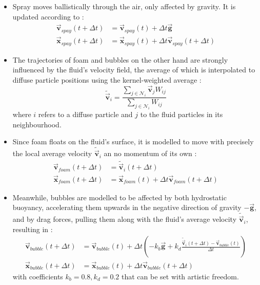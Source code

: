 \documentclass[oneside, a4paper]{book}
\newcommand\vek[1]{\vec{\bm{#1}}}
\newcommand\br[1]{\left(#1\right)}
\begin{document}
  \begin{itemize}
    \item Spray moves ballistically through the air, only affected by gravity. It is updated according to \autocite{spray-foam-bubbles}:
    \begin{align}
      \vek{v}_{spay}\br{t+\Delta t} &= \vek{v}_{spay}\br{t} + \Delta t \vek{g}\\
      \vek{x}_{spay}\br{t+\Delta t} &= \vek{x}_{spay}\br{t} + \Delta t \vek{v}_{spay}\br{t+\Delta t}
    \end{align}
    \item The trajectories of foam and bubbles on the other hand are strongly influenced by the fluid's velocity field, the average of which is interpolated to diffuse particle positions using the kernel-weighted average \autocite{spray-foam-bubbles}:
    \begin{equation}
      \widetilde{\vek{v}}_i = \frac{\sum_{j\in\mathcal{N}_{i}} \vek{v}_{j} W_{ij} }{\sum_{j\in\mathcal{N}_{i}} W_{ij}}
    \end{equation}
    where $i$ refers to a diffuse particle and $j$ to the fluid particles in its neighbourhood.
    \item Since foam floats on the fluid's surface, it is modelled to move with precisely the local average velocity $\widetilde{\vek{v}}_i$ an no momentum of its own \autocite{spray-foam-bubbles}:
    \begin{align}
      \vek{v}_{foam}\br{t+\Delta t} &= \widetilde{\vek{v}}_i\br{t+\Delta t}\\
      \vek{x}_{foam}\br{t+\Delta t} &= \vek{x}_{foam}\br{t} + \Delta t \vek{v}_{foam}\br{t+\Delta t}
    \end{align}
    \item Meanwhile, bubbles are modelled to be affected by both hydrostatic buoyancy, accelerating them upwards in the negative direction of gravity $-\vek{g}$, and by drag forces, pulling them along with the fluid's average velocity $\widetilde{\vek{v}}_i$, resulting in \autocite{spray-foam-bubbles}:
    \begin{align}
      \vek{v}_{bubble}\br{t+\Delta t} &=\vek{v}_{bubble}\br{t} + \Delta t \br{
        -k_b \vek{g} + k_d \frac{\widetilde{\vek{v}}_i\br{t+\Delta t} - \vek{v}_{bubble}\br{t}}{\Delta t}
      }\\
      \vek{x}_{bubble}\br{t+\Delta t} &= \vek{x}_{bubble}\br{t} + \Delta t \vek{v}_{bubble}\br{t+\Delta t}
    \end{align}
    with coefficients $k_b=0.8, k_d=0.2$ that can be set with artistic freedom.
  \end{itemize}
\end{document}
